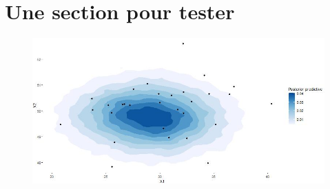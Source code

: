   \section{Une section pour tester}

\begin{figure}[h!]
  \begin{center}
      \includegraphics[scale=0.4]{density-predictive-full-X.jpeg}
  \end{center}
  \end{figure}